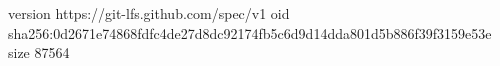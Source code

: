 version https://git-lfs.github.com/spec/v1
oid sha256:0d2671e74868fdfc4de27d8dc92174fb5c6d9d14dda801d5b886f39f3159e53e
size 87564
